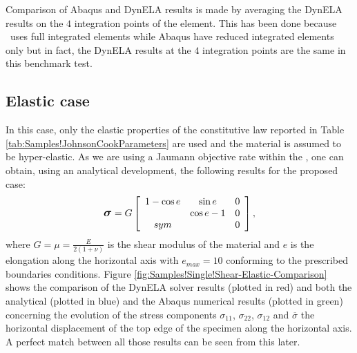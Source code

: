 Comparison of Abaqus and DynELA results is made by averaging the DynELA
results on the $4$ integration points of the element. This has been
done because \Dynela~uses full integrated elements while Abaqus
have reduced integrated elements only but in fact, the DynELA results
at the $4$ integration points are the same in this benchmark test.

\subsection{Elastic case}

In this case, only the elastic properties of the constitutive law
reported in Table \ref{tab:Samples!JohnsonCookParameters} are used
and the material is assumed to be hyper-elastic. As we are using a
Jaumann objective rate within the \Dynela, one can obtain, using
an analytical development, the following results for the proposed
case:
\begin{equation}
\mbox{\large\ensuremath{\boldsymbol{\sigma}}}=G\left[\begin{array}{ccc}
1-\cos e & \sin e & 0\\
 & \cos e-1 & 0\\
sym &  & 0
\end{array}\right],
\end{equation}
where $G=\mu=\frac{E}{2(1+\nu)}$ is the shear modulus of the material
and $e$ is the elongation along the horizontal axis with $e_{max}=10$
conforming to the prescribed boundaries conditions. Figure \ref{fig:Samples!Single!Shear-Elastic-Comparison}
shows the comparison of the DynELA solver results (plotted in red)
and both the analytical (plotted in blue) and the Abaqus numerical
results (plotted in green) concerning the evolution of the stress
components $\sigma_{11}$, $\sigma_{22}$, $\sigma_{12}$ and $\overline{\sigma}$
\versus  the horizontal displacement of the top edge of the specimen
along the horizontal axis. A perfect match between all those results
can be seen from this later.

